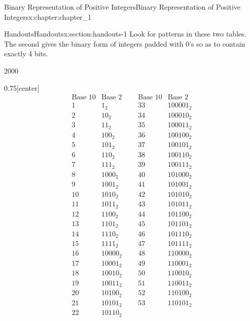 \documentclass[oneside,10pt,]{book}
\numberwithin{equation}{section}
\begin{document}
\begin{chapterptx}{Binary Representation of Positive Integers}{}{Binary Representation of Positive Integers}{}{}{x:chapter:chapter_1}
%
%
\typeout{************************************************}
\typeout{************************************************}
%
\begin{sectionptx}{Handouts}{}{Handouts}{}{}{x:section:handouts-1}
Look for patterns in these two tables. The second gives the binary form of integers padded with 0's so as to contain exactly 4 bits.%
\begin{sidebyside}{2}{0}{0}{0}%
\begin{sbspanel}{0.75}[center]%
%
\begin{equation*}
\begin{array}{ccccc}
\text{Base 10} & \text{Base
2} & \text{} & \text{Base
10} & \text{Base 2} \\
1 & 1_2 & \text{     } & 33 &
100001_2 \\
2 & 10_2 & \text{     } & 34
& 100010_2 \\
3 & 11_2 & \text{     } & 35
& 100011_2 \\
4 & 100_2 & \text{     } & 36
& 100100_2 \\
5 & 101_2 & \text{     } & 37
& 100101_2 \\
6 & 110_2 & \text{     } & 38
& 100110_2 \\
7 & 111_2 & \text{     } & 39
& 100111_2 \\
8 & 1000_2 & \text{     } &
40 & 101000_2 \\
9 & 1001_2 & \text{     } &
41 & 101001_2 \\
10 & 1010_2 & \text{     } &
42 & 101010_2 \\
11 & 1011_2 & \text{     } &
43 & 101011_2 \\
12 & 1100_2 & \text{     } &
44 & 101100_2 \\
13 & 1101_2 & \text{     } &
45 & 101101_2 \\
14 & 1110_2 & \text{     } &
46 & 101110_2 \\
15 & 1111_2 & \text{     } &
47 & 101111_2 \\
16 & 10000_2 & \text{     } &
48 & 110000_2 \\
17 & 10001_2 & \text{     } &
49 & 110001_2 \\
18 & 10010_2 & \text{     } &
50 & 110010_2 \\
19 & 10011_2 & \text{     } &
51 & 110011_2 \\
20 & 10100_2 & \text{     } &
52 & 110100_2 \\
21 & 10101_2 & \text{     } &
53 & 110101_2 \\
22 & 10110_2 & \text{     } &

\end{array}
\end{equation*}
\end{sbspanel}
\end{sidebyside}
\end{sectionptx}
\end{chapterptx}
\end{document}
